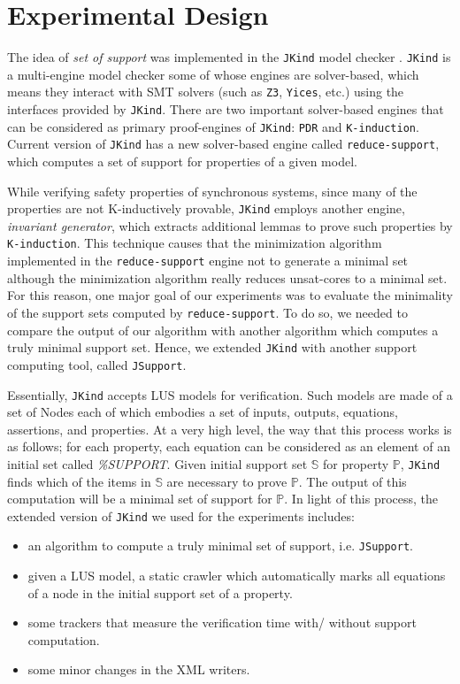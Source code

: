 \section{Experimental Design}
\label{sec:exprm}
The idea of \emph{set of support} \cite{setofsupp} was implemented in the \texttt{JKind} model checker \cite{jkind}.
\texttt{JKind} is a multi-engine model checker some of whose engines are solver-based,
which means they interact with SMT solvers (such as \texttt{Z3}, \texttt{Yices}, etc.) using the interfaces provided by \texttt{JKind}. There are two important solver-based engines that can be considered as primary proof-engines of \texttt{JKind}: \texttt{PDR} and \texttt{K-induction}. Current version of \texttt{JKind} has a new solver-based engine called \texttt{reduce-support}, which computes a set of support for properties of a given model.

While verifying safety properties of synchronous systems, since many of the properties are not K-inductively provable, \texttt{JKind} employs another engine, \emph{invariant generator},
which extracts additional lemmas to prove such properties by \texttt{K-induction}. 
This technique causes that the minimization algorithm implemented in the \texttt{reduce-support} engine not to generate a minimal set although the minimization algorithm really reduces unsat-cores to a minimal set.
For this reason, 
one major goal of our experiments was to evaluate the minimality of the support sets computed by \texttt{reduce-support}. 
To do so, we needed to compare the output of our algorithm with another algorithm 
which computes a truly minimal support set. Hence, we extended \texttt{JKind} 
with another support computing tool, called \texttt{JSupport}.

 Essentially, \texttt{JKind} accepts LUS models for verification. Such models are made of a set of Nodes each of which embodies a set of inputs, outputs, equations, assertions, and properties. At a very high level, the way that this process works is as follows; for each property, each equation can be considered as an element of an initial set called \textit{\%SUPPORT}. Given initial support set $\mathbb{S}$ for property $\mathbb{P}$, \texttt{JKind} finds which of the items in $\mathbb{S}$ are necessary to prove $\mathbb{P}$. The output of this computation will be a minimal set of support for $\mathbb{P}$. In light of this process, the extended version of \texttt{JKind} we used for the experiments includes:
 
\begin{itemize}
    \item an algorithm to compute a truly minimal set of support, i.e. \texttt{JSupport}.
    \item given a LUS model, a static crawler which automatically marks all equations of a node in the initial support set of a property.
    \item some trackers that measure the verification time with/ without support computation.
    \item some minor changes in the XML writers.
\end{itemize}

